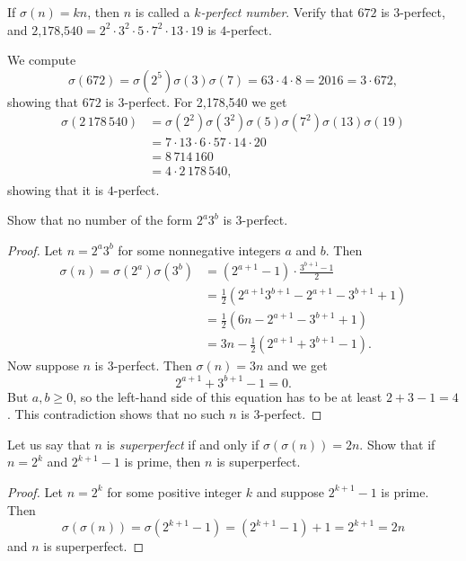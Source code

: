  If $\sigma(n) = kn$, then $n$ is called a {\em $k$-perfect
  number}. Verify that $672$ is $3$-perfect, and
$\text{2,178,540} = 2^2\cdot3^2\cdot5\cdot7^2\cdot13\cdot19$ is
$4$-perfect.
\begin{solution}
  We compute
  \begin{equation*}
    \sigma(672) = \sigma(2^5)\sigma(3)\sigma(7)
    = 63\cdot4\cdot8
    = 2016 = 3\cdot672,
  \end{equation*}
  showing that $672$ is $3$-perfect. For 2,178,540 we get
  \begin{align*}
    \sigma(2\,178\,540)
    &= \sigma(2^2)\sigma(3^2)\sigma(5)\sigma(7^2)\sigma(13)\sigma(19) \\
    &= 7\cdot13\cdot6\cdot57\cdot14\cdot20 \\
    &= 8\,714\,160 \\
    &= 4\cdot2\,178\,540,
  \end{align*}
  showing that it is $4$-perfect.
\end{solution}

 Show that no number of the form $2^a3^b$ is $3$-perfect.
\begin{proof}
  Let $n = 2^a3^b$ for some nonnegative integers $a$ and $b$. Then
  \begin{align*}
    \sigma(n) = \sigma(2^a)\sigma(3^b)
    &= (2^{a+1} - 1)\cdot\frac{3^{b+1} - 1}2 \\
    &= \frac12(2^{a+1}3^{b+1} - 2^{a+1} - 3^{b+1} + 1) \\
    &= \frac12(6n - 2^{a+1} - 3^{b+1} + 1) \\
    &= 3n - \frac12(2^{a+1} + 3^{b+1} - 1).
  \end{align*}
  Now suppose $n$ is $3$-perfect. Then $\sigma(n) = 3n$ and we get
  \begin{equation*}
    2^{a+1} + 3^{b+1} - 1 = 0.
  \end{equation*}
  But $a,b\geq0$, so the left-hand side of this equation has to be at
  least $2 + 3 - 1 = 4$. This contradiction shows that no such $n$ is
  $3$-perfect.
\end{proof}

 Let us say that $n$ is {\em superperfect}\/ if and only if
$\sigma(\sigma(n)) = 2n$. Show that if $n = 2^k$ and $2^{k+1} - 1$ is
prime, then $n$ is superperfect.
\begin{proof}
  Let $n = 2^k$ for some positive integer $k$ and suppose
  $2^{k+1} - 1$ is prime. Then
  \begin{equation*}
    \sigma(\sigma(n)) = \sigma(2^{k+1} - 1) = (2^{k+1} - 1) + 1
    = 2^{k+1} = 2n
  \end{equation*}
  and $n$ is superperfect.
\end{proof}

